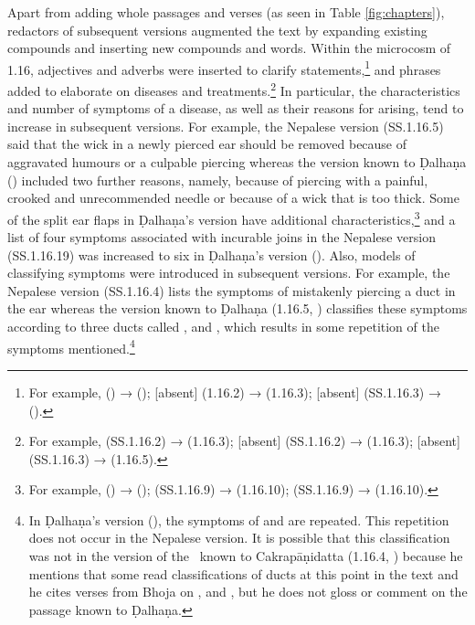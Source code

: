 Apart from adding whole passages and verses (as seen in Table \ref{fig:chapters}),
redactors of subsequent versions augmented the text by expanding existing
compounds and inserting new compounds and words. Within the microcosm of 1.16,
adjectives and adverbs were inserted to clarify statements,\footnote{For example,
     () → 
    (); [absent] (1.16.2) →  (1.16.3); 
    [absent] (SS.1.16.3) →  ().} and phrases added to
    elaborate on diseases and treatments.\footnote{For example, 
        (SS.1.16.2) →  (1.16.3); [absent] (SS.1.16.2) →
         (1.16.3);  [absent] (SS.1.16.3) →
         (1.16.5).} In particular, the characteristics and
        number of symptoms of a disease, as well as their reasons for arising, tend to
        increase in subsequent versions. For example, the Nepalese version (SS.1.16.5)
        said that the wick in a newly pierced ear should be removed because of aggravated
        humours or a culpable piercing whereas the version known to Ḍalhaṇa 
        () included two further reasons, namely, because of piercing with
        a painful, crooked and unrecommended needle or because of a wick that is too
        thick. Some of the split ear flaps in Ḍalhaṇa's version have additional
        characteristics,\footnote{For example, 
            () →  ();  
            (SS.1.16.9)
            →  (1.16.10); 
            (SS.1.16.9) →  (1.16.10).} and a list of four symptoms
            associated with incurable joins in the Nepalese version (SS.1.16.19) was increased
            to six in Ḍalhaṇa's version (). Also, models of
            classifying symptoms were introduced in subsequent versions. For example, the
            Nepalese version (SS.1.16.4) lists the symptoms of mistakenly piercing a duct in
            the ear whereas the version known to Ḍalhaṇa (1.16.5, \cite[76–77]{vulgate})
            classifies these symptoms according to three ducts called ,
             and , which results in some repetition of the
            symptoms mentioned.\footnote{In Ḍalhaṇa's version  (), 
            the
                symptoms of  and  are repeated. This 
                repetition
                does not occur in the Nepalese version. It is possible that this classification
                was not in the version of the \SS\ known to Cakrapāṇidatta (1.16.4,
                \cite[126]{acar-1939}) because he mentions that some read classifications of ducts
                at this point in the text and he cites verses from Bhoja on ,
                 and , but he does not gloss or comment on the
                passage known to Ḍalhaṇa.}

